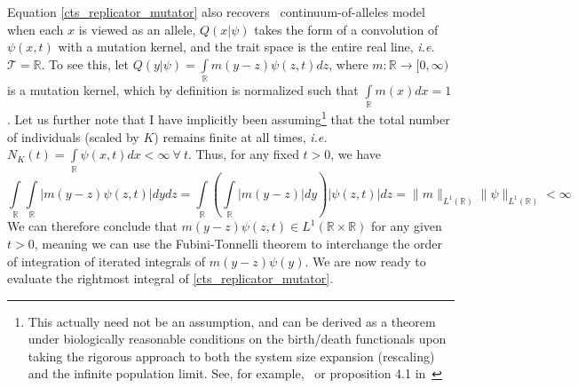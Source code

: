 Equation \eqref{cts_replicator_mutator} also recovers~ continuum-of-alleles model when each $x$ is viewed as an allele, $Q(x|\psi)$ takes the form of a convolution of $\psi(x,t)$ with a mutation kernel, and the trait space is the entire real line, \emph{i.e.} $\mathcal{T} = \mathbb{R}$. To see this, let $Q(y|\psi) = \int\limits_{\mathbb{R}}m(y-z)\psi(z,t)dz$, where $m:\mathbb{R} \to [0,\infty)$ is a mutation kernel, which by definition is normalized such that $\int\limits_{\mathbb{R}}m(x)dx = 1$. Let us further note that I have implicitly been assuming\footnote{This actually need not be an assumption, and can be derived as a theorem under biologically reasonable conditions on the birth/death functionals upon taking the rigorous approach to both the system size expansion (rescaling) and the infinite population limit. See, for example,~\citet{etheridge_introduction_2000} or proposition 4.1 in~\citet{champagnat_individual_2008}} that the total number of individuals (scaled by $K$) remains finite at all times, \emph{i.e.} $N_K(t) = \int\limits_{\mathbb
R}\psi(x,t)dx < \infty \ \forall \ t$. Thus, for any fixed $t > 0$, we have
\begin{equation*}
\int\limits_{\mathbb{R}}\int\limits_{\mathbb{R}}|m(y-z)\psi(z,t)|dydz =  \int\limits_{\mathbb{R}}\left(\int\limits_{\mathbb{R}}|m(y-z)|dy\right)|\psi(z,t)|dz
= \|m\|_{L^{1}(\mathbb{R})}\|\psi\|_{L^{1}(\mathbb{R})} < \infty
\end{equation*}
We can therefore conclude that $m(y-z)\psi(z,t) \in  L^{1}(\mathbb{R}\times\mathbb{R})$ for any given $t>0$, meaning we can use the Fubini-Tonnelli theorem to interchange the order of integration of iterated integrals of $m(y-z)\psi(y)$. We are now ready to evaluate the rightmost integral of \eqref{cts_replicator_mutator}.

